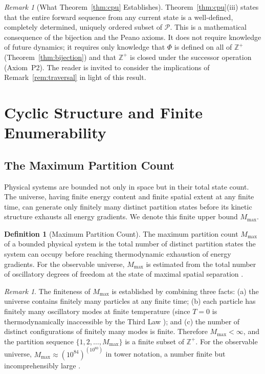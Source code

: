 \documentclass[twocolumn,10pt,a4paper]{article}
\theoremstyle{thmstyle}
\theoremstyle{definition}
\newtheorem{definition}[theorem]{Definition}
\theoremstyle{remark}
\newtheorem{remark}[theorem]{Remark}
\newcommand{\Zp}{\mathbb{Z}^{+}}
\newcommand{\Parts}{\mathcal{P}}
\newcommand{\Mmax}{M_{\max}}
\newcommand{\PhiMap}{\varPhi}
\begin{document}
\begin{remark}[What Theorem~\ref{thm:cpu} Establishes]
Theorem~\ref{thm:cpu}(iii) states that the entire forward sequence from any current state is a well-defined, completely determined, uniquely ordered subset of $\Parts$. This is a mathematical consequence of the bijection and the Peano axioms. It does not require knowledge of future dynamics; it requires only knowledge that $\PhiMap$ is defined on all of $\Zp$ (Theorem~\ref{thm:bijection}) and that $\Zp$ is closed under the successor operation (Axiom~P2). The reader is invited to consider the implications of Remark~\ref{rem:traversal} in light of this result.
\end{remark}

\section{Cyclic Structure and Finite Enumerability}
\label{sec:cyclic}

\subsection{The Maximum Partition Count}

Physical systems are bounded not only in space but in their total state count. The universe, having finite energy content and finite spatial extent at any finite time, can generate only finitely many distinct partition states before its kinetic structure exhausts all energy gradients. We denote this finite upper bound $\Mmax$.

\begin{definition}[Maximum Partition Count]
\label{def:mmax}
The maximum partition count $\Mmax$ of a bounded physical system is the total number of distinct partition states the system can occupy before reaching thermodynamic exhaustion of energy gradients. For the observable universe, $\Mmax$ is estimated from the total number of oscillatory degrees of freedom at the state of maximal spatial separation \citep{penrose2004,kelvin1852,gibbs1902}.
\end{definition}

\begin{remark}
The finiteness of $\Mmax$ is established by combining three facts: (a) the universe contains finitely many particles at any finite time; (b) each particle has finitely many oscillatory modes at finite temperature (since $T = 0$ is thermodynamically inaccessible by the Third Law \citep{planck1900}); and (c) the number of distinct configurations of finitely many modes is finite. Therefore $\Mmax < \infty$, and the partition sequence $\{1, 2, \ldots, \Mmax\}$ is a finite subset of $\Zp$. For the observable universe, $\Mmax \approx (10^{84})^{(10^{80})}$ in tower notation, a number finite but incomprehensibly large \citep{penrose2004}.
\end{remark}
\end{document}
